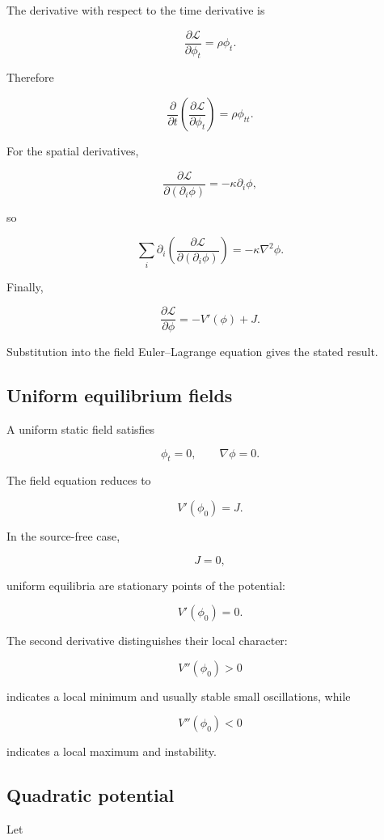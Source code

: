 The derivative with respect to the time derivative is

\[
\frac{\partial\mathcal{L}}{\partial\phi_{t}}
=
\rho\phi_{t}.
\]

Therefore

\[
\frac{\partial}{\partial t}
\left(
\frac{\partial\mathcal{L}}{\partial\phi_{t}}
\right)
=
\rho\phi_{tt}.
\]

For the spatial derivatives,

\[
\frac{\partial\mathcal{L}}
{\partial(\partial_{i}\phi)}
=
-\kappa\partial_{i}\phi,
\]

so

\[
\sum_{i}
\partial_{i}
\left(
\frac{\partial\mathcal{L}}
{\partial(\partial_{i}\phi)}
\right)
=
-\kappa\nabla^{2}\phi.
\]

Finally,

\[
\frac{\partial\mathcal{L}}{\partial\phi}
=
-V'(\phi)+J.
\]

Substitution into the field Euler--Lagrange equation gives the stated result.

\subsection{Uniform equilibrium fields}

A uniform static field satisfies

\[
\phi_{t}=0,
\qquad
\nabla\phi=0.
\]

The field equation reduces to

\[
\boxed{
V'(\phi_{0})=J
}.
\]

In the source-free case,

\[
J=0,
\]

uniform equilibria are stationary points of the potential:

\[
V'(\phi_{0})=0.
\]

The second derivative distinguishes their local character:

\[
V''(\phi_{0})>0
\]

indicates a local minimum and usually stable small oscillations, while

\[
V''(\phi_{0})<0
\]

indicates a local maximum and instability.

\subsection{Quadratic potential}

Let

